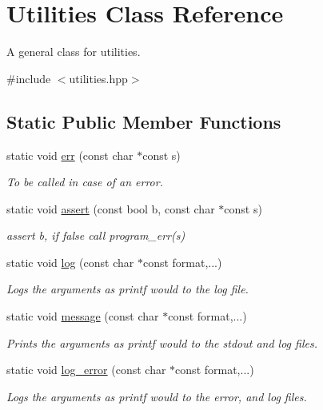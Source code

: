 \hypertarget{class_utilities}{}\section{Utilities Class Reference}
\label{class_utilities}


A general class for utilities.  




{\ttfamily \#include $<$utilities.\+hpp$>$}

\subsection*{Static Public Member Functions}
\begin{DoxyCompactItemize}
\item 
static void \hyperlink{class_utilities_a5308da50597c93aad2b1ca2ecfbcb723}{err} (const char $\ast$const s)
\begin{DoxyCompactList}\small\item\em To be called in case of an error. \end{DoxyCompactList}\item 
static void \hyperlink{class_utilities_a22c85a2970e168ca0b9ad6fd86752792}{assert} (const bool b, const char $\ast$const s)
\begin{DoxyCompactList}\small\item\em assert b, if false call program\+\_\+err(s) \end{DoxyCompactList}\item 
static void \hyperlink{class_utilities_a7e53321a2a9460f126a476a89b08107b}{log} (const char $\ast$const format,...)
\begin{DoxyCompactList}\small\item\em Logs the arguments as printf would to the log file. \end{DoxyCompactList}\item 
static void \hyperlink{class_utilities_a0e46f2da74b1069eb9df671efed9180d}{message} (const char $\ast$const format,...)
\begin{DoxyCompactList}\small\item\em Prints the arguments as printf would to the stdout and log files. \end{DoxyCompactList}\item 
static void \hyperlink{class_utilities_a48952d33b9dc4fba9846dbc7a12df2f1}{log\+\_\+error} (const char $\ast$const format,...)
\begin{DoxyCompactList}\small\item\em Logs the arguments as printf would to the error, and log files. \end{DoxyCompactList}\end{DoxyCompactItemize}
